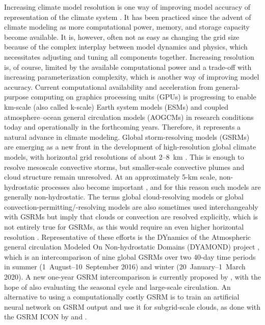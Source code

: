 \documentclass[draft]{agujournal2019}
\begin{document}
Increasing climate model resolution is one way of improving model accuracy of representation of the climate system \cite{mauritsen2022}. It has been practiced since the advent of climate modeling as more computational power, memory, and storage capacity become available. It is, however, often not as easy as changing the grid size because of the complex interplay between model dynamics and physics, which necessitates adjusting and tuning all components together. Increasing resolution is, of course, limited by the available computational power and a trade-off with increasing parameterization complexity, which is another way of improving model accuracy. Current computational availability and acceleration from general-purpose computing on graphics processing units (GPUs) is progressing to enable km-scale (also called k-scale) Earth system models (ESMs) and coupled atmosphere--ocean general circulation models (AOGCMs) in research conditions today and operationally in the forthcoming years. Therefore, it represents a natural advance in climate modeling. Global storm-resolving models (GSRMs) are emerging as a new front in the development of high-resolution global climate models, with horizontal grid resolutions of about 2--8~km \cite{satoh2019,stevens2019}. This is enough to resolve mesoscale convective storms, but smaller-scale convective plumes and cloud structure remain unresolved. At an approximately 5-km scale, non-hydrostatic processes also become important \cite{weisman1997}, and for this reason such models are generally non-hydrostatic. The terms global cloud-resolving models or global convection-permitting/-resolving models are also sometimes used interchangeably with GSRMs but imply that clouds or convection are resolved explicitly, which is not entirely true for GSRMs, as this would require an even higher horizontal resolution \cite{satoh2019}. Representative of these efforts is the DYnamics of the Atmospheric general circulation Modeled On Non-hydrostatic Domains (DYAMOND) project \cite{stevens2019,dyamond}, which is an intercomparison of nine global GSRMs over two 40-day time periods in summer (1~August--10~September 2016) and winter (20~January--1~March 2020). A new one-year GSRM intercomparison is currently proposed by , with the hope of also evaluating the seasonal cycle and large-scale circulation. An alternative to using a computationally costly GSRM is to train an artificial neural network on GSRM output and use it for subgrid-scale clouds, as done with the GSRM ICON by  and .
\end{document}
